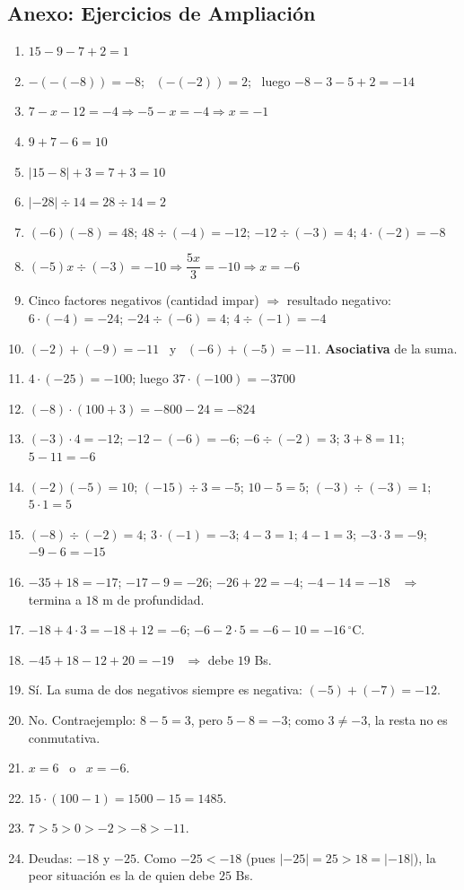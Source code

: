 \documentclass[12pt, letterpaper]{article}
\begin{document}
  \subsection*{Anexo: Ejercicios de Ampliación}

  \begin{enumerate}[leftmargin=*, label=\textbf{\arabic*.}]
    \item $15 - 9 - 7 + 2 = 1$
    \item $-(-(-8)) = -8$; \ $(-(-2)) = 2$; \ luego $-8 - 3 - 5 + 2 = -14$
    \item $7 - x - 12 = -4 \Rightarrow -5 - x = -4 \Rightarrow x = -1$
    \item $9 + 7 - 6 = 10$
    \item $|15 - 8| + 3 = 7 + 3 = 10$
    \item $|-28| \div 14 = 28 \div 14 = 2$
    \item $(-6)(-8) = 48$; $48 \div (-4) = -12$; $-12 \div (-3) = 4$; $4 \cdot (-2) = -8$
    \item $(-5)x \div (-3) = -10 \Rightarrow \dfrac{5x}{3} = -10 \Rightarrow x = -6$
    \item Cinco factores negativos (cantidad impar) $\Rightarrow$ resultado negativo: $6 \cdot (-4) = -24$; $-24 \div (-6) = 4$; $4 \div (-1) = -4$
    \item $(-2) + (-9) = -11$ \ y \ $(-6) + (-5) = -11$. \textbf{Asociativa} de la suma.
    \item $4 \cdot (-25) = -100$; luego $37 \cdot (-100) = -3700$
    \item $(-8) \cdot (100 + 3) = -800 - 24 = -824$
    \item $(-3) \cdot 4 = -12$; $-12 - (-6) = -6$; $-6 \div (-2) = 3$; $3 + 8 = 11$; $5 - 11 = -6$
    \item $(-2)(-5) = 10$; $(-15) \div 3 = -5$; $10 - 5 = 5$; $(-3) \div (-3) = 1$; $5 \cdot 1 = 5$
    \item $(-8) \div (-2) = 4$; $3 \cdot (-1) = -3$; $4 - 3 = 1$; $4 - 1 = 3$; $-3 \cdot 3 = -9$; $-9 - 6 = -15$
    \item $-35 + 18 = -17$; $-17 - 9 = -26$; $-26 + 22 = -4$; $-4 - 14 = -18$ \ $\Rightarrow$ termina a $18$ m de profundidad.
    \item $-18 + 4 \cdot 3 = -18 + 12 = -6$; $-6 - 2 \cdot 5 = -6 - 10 = -16\,^{\circ}$C.
    \item $-45 + 18 - 12 + 20 = -19$ \ $\Rightarrow$ debe $19$ Bs.
    \item Sí. La suma de dos negativos siempre es negativa: $(-5) + (-7) = -12$.
    \item No. Contraejemplo: $8 - 5 = 3$, pero $5 - 8 = -3$; como $3 \neq -3$, la resta no es conmutativa.
    \item $x = 6$ \ o \ $x = -6$.
    \item $15 \cdot (100 - 1) = 1500 - 15 = 1485$.
    \item $7 > 5 > 0 > -2 > -8 > -11$.
    \item Deudas: $-18$ y $-25$. Como $-25 < -18$ (pues $|-25| = 25 > 18 = |-18|$), la peor situación es la de quien debe $25$ Bs.
  \end{enumerate}
\end{document}
